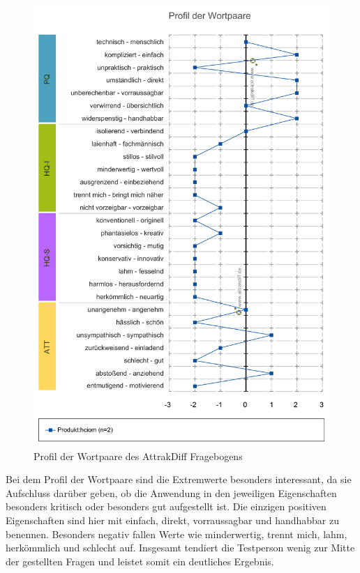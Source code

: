 \documentclass[runningheads,a4paper, 12pt]{llncs}
\begin{document}
\begin{figure}[H]
	\centering
	\includegraphics[angle=0,scale=0.4]{attrakdiff_result}
	\caption{Profil der Wortpaare des AttrakDiff Fragebogens}
	\label{fig:result4}
\end{figure}
Bei dem Profil der Wortpaare sind die Extremwerte besonders interessant, da sie Aufschluss darüber geben, ob die Anwendung in den jeweiligen Eigenschaften besonders kritisch oder besonders gut aufgestellt ist. Die einzigen positiven Eigenschaften sind hier mit einfach, direkt, vorraussagbar und handhabbar zu benennen. Besonders negativ fallen Werte wie minderwertig, trennt mich, lahm, herkömmlich und schlecht auf. Insgesamt tendiert die Testperson wenig zur Mitte der gestellten Fragen und leistet somit ein deutliches Ergebnis.
\end{document}
